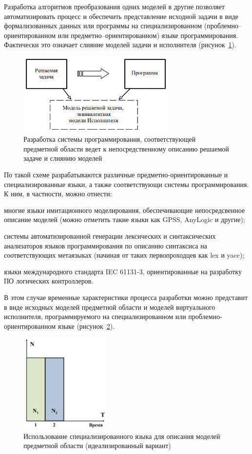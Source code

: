 Разработка алгоритмов преобразования одних моделей в другие позволяет автоматизировать процесс и обеспечить представление исходной задачи в виде формализованных данных или программы на специализированном (про\-блем\-но--ориентированном или предметно--ориентированном) языке программирования. Фактически это означает слияние моделей задачи и исполнителя (рисунок~\ref{fig01-03b}).

\begin{figure}[htbp]
    \centering
    \includegraphics[width=0.7\textwidth]{img/fig01-03b.png}
    \caption{Разработка системы программирования, соответствующей предметной области ведет к непосредственному описанию решаемой задаче и слиянию моделей}
    \label{fig01-03b}
\end{figure}

По такой схеме разрабатываются различные предметно-ориентированные и специализированные языки, а также соответствующи системы программирования. К ним, в частности, можно отнести:

многие языки имитационного моделирования, обеспечивающие непосредсвенное описание моделей (можно отметить такие языки как GPSS, AnyLogic и другие);

системы автоматизированной генерации лексических и синтаксических анализаторов языков программирования по описанию синтаксиса на соответствующих метаязыках (начиная от таких первопроходцев как lex и yacc);

языки международного стандарта IEC 61131-3, ориентированные на разработку ПО логических контроллеров.

В этом случае временные характеристики процесса разработки можно представит в виде исходных моделей предметной области и моделей виртуального исполнителя, программируемого на специализированном или проблемно-ориентированном языке (рисунок~\ref{fdiag03}).

\begin{figure}[htbp]
    \centering
    \includegraphics[width=0.4\textwidth]{img/fdiag03.png}
    \caption{Использование специализированного языка для описания моделей предметной области (идеализированный вариант)}
    \label{fdiag03}
\end{figure}

